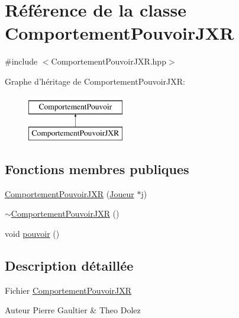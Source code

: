 \hypertarget{class_comportement_pouvoir_j_x_r}{\section{Référence de la classe Comportement\-Pouvoir\-J\-X\-R}
\label{class_comportement_pouvoir_j_x_r}
}


{\ttfamily \#include $<$Comportement\-Pouvoir\-J\-X\-R.\-hpp$>$}

Graphe d'héritage de Comportement\-Pouvoir\-J\-X\-R\-:\begin{figure}[H]
\begin{center}
\leavevmode
\includegraphics[height=2.000000cm]{class_comportement_pouvoir_j_x_r}
\end{center}
\end{figure}
\subsection*{Fonctions membres publiques}
\begin{DoxyCompactItemize}
\item 
\hyperlink{class_comportement_pouvoir_j_x_r_a6bfa37111b1d6add5cabd1c5a433291b}{Comportement\-Pouvoir\-J\-X\-R} (\hyperlink{class_joueur}{Joueur} $\ast$j)
\item 
\hyperlink{class_comportement_pouvoir_j_x_r_a60e6ba18e25818261a5c11bd6780db10}{$\sim$\-Comportement\-Pouvoir\-J\-X\-R} ()
\item 
void \hyperlink{class_comportement_pouvoir_j_x_r_a3d40cb49543bd69accaa1ddfb09aa9cc}{pouvoir} ()
\end{DoxyCompactItemize}


\subsection{Description détaillée}
Fichier \hyperlink{class_comportement_pouvoir_j_x_r}{Comportement\-Pouvoir\-J\-X\-R} \begin{DoxyAuthor}{Auteur}
Pierre Gaultier \& Theo Dolez 
\end{DoxyAuthor}


